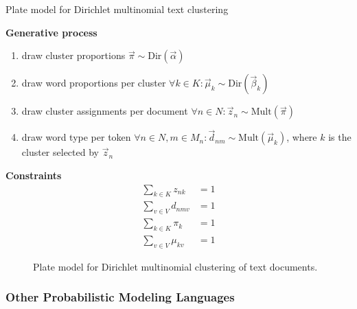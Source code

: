 \begin{Example} Plate model for Dirichlet multinomial text clustering
\label{ex:clustering-pm}

\textbf{Generative process}
\begin{enumerate}
\item draw cluster proportions $\vec \pi \sim \text{Dir}(\vec \alpha)$
\item draw word proportions per cluster $\forall k \in K: \vec \mu_k \sim \text{Dir}(\vec \beta_k)$
\item draw cluster assignments per document $\forall n \in N: \vec z_n \sim \text{Mult}(\vec \pi)$
\item draw word type per token $\forall n \in N, m \in M_n: \vec d_{nm} \sim \text{Mult}(\vec \mu_k)$, where $k$ is the cluster selected by $\vec z_n$
\end{enumerate}

\textbf{Constraints}
\begin{align}
\sum_{k \in K} z_{nk} &= 1\\
\sum_{v \in V} d_{nmv} &= 1\\
\sum_{k \in K} \pi_{k} &= 1\\
\sum_{v \in V} \mu_{kv} &= 1
\end{align}

\begin{figure}[t]
	\begin{center}
    	\scalebox{\tikzScale}{\adjustTikzSize }
	\end{center}
\caption[Plate model for Dirichlet multinomial clustering of text documents]{Plate model for Dirichlet multinomial clustering of text documents.}
		\label{fig:clustering_platemodel}
\end{figure}

\end{Example}

\subsubsection{Other Probabilistic Modeling Languages}

